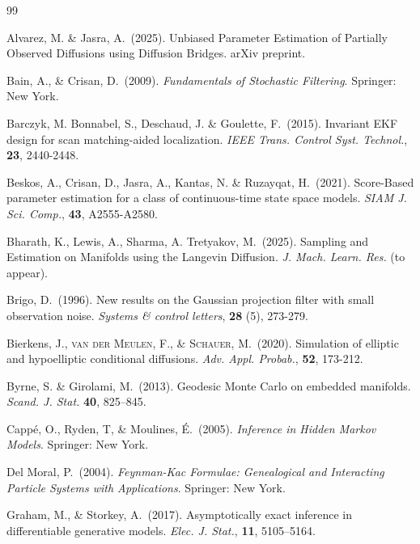 \documentclass[english,13pt]{article}
\numberwithin{equation}{section}
\begin{document}
\begin{thebibliography}{99}

{\sc Alvarez}, M.  \& {\sc Jasra}, A.~(2025). 
Unbiased Parameter Estimation of Partially Observed Diffusions using Diffusion Bridges.  arXiv preprint.


{\sc Bain}, A., \& {\sc Crisan}, D.~(2009). \emph{Fundamentals of Stochastic Filtering}. Springer: New York.

{\sc Barczyk}, M. {\sc Bonnabel,} S., {\sc Deschaud}, J. \& {\sc Goulette},  F.~(2015).
Invariant EKF design for scan matching-aided localization. \emph{IEEE Trans. Control Syst. Technol.}, 
{\bf 23}, 2440-2448.


{\sc Beskos}, A., {\sc Crisan}, D., {\sc Jasra}, A., {\sc Kantas}, N. \& {\sc Ruzayqat}, H.~(2021).
Score-Based parameter estimation for a class of continuous-time state space models.
\emph{SIAM J. Sci. Comp.}, {\bf 43},  A2555-A2580.


{\sc Bharath}, K., {\sc Lewis}, A., {\sc Sharma},  A. {\sc Tretyakov},  M.~(2025).  Sampling and Estimation on Manifolds using the Langevin Diffusion. \emph{J. Mach. Learn. Res.} (to appear). 


{\sc Brigo}, D.~(1996). New results on the Gaussian projection filter with small observation noise. \emph{Systems \& control letters}, {\bf 28} (5), 273-279.



{\sc Bierkens}, J.,  \textsc{van der Meulen}, F., \& \textsc{Schauer}, M.~(2020).  Simulation of elliptic and hypoelliptic conditional diffusions.  \emph{Adv.  Appl.  Probab.},  {\bf 52},  173-212.

{\sc Byrne}, S. \& {\sc Girolami},  M.~(2013). Geodesic Monte Carlo on embedded manifolds.  \emph{Scand.  J.  Stat.}
{\bf 40},  825--845.

{\sc Capp\'e}, O., {\sc Ryden}, T, \& {\sc Moulines}, \'E.~(2005). \emph{Inference
in Hidden Markov Models}. Springer: New York.

{\sc Del Moral}, P.~(2004).
\emph{Feynman-Kac Formulae: Genealogical and Interacting Particle Systems with Applications}. Springer: New York.



{\sc Graham,} M.,  \& {\sc Storkey},  A.~(2017). Asymptotically exact inference in differentiable generative models.
\emph{Elec. J. Stat.}, {\bf 11},  5105--5164.


\end{thebibliography}
\end{document}
